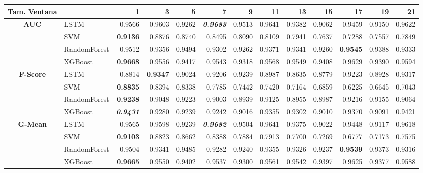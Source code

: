 \begin{table}[H]
	\centering
	\begin{adjustbox}{max width=14cm}
		\begin{tabular}{|c|l|r|r|r|r|r|r|r|r|r|r|r|}
			\hline
			\textbf{Tam. Ventana}&         &      1  &      3  &      5  &      7  &      9  &      11 &      13 &      15 &      17 &      19 &      21 \\
			\hline
			\textbf{AUC} &  LSTM &  0.9566 &  0.9603 &  0.9262 & \textit{ \textbf{  0.9683 } } &  0.9513 &  0.9641 &  0.9382 &  0.9062 &  0.9459 &  0.9150 &  0.9622 \\
			&  SVM & \textbf{  0.9136 } &  0.8876 &  0.8740 &  0.8495 &  0.8090 &  0.8109 &  0.7941 &  0.7637 &  0.7288 &  0.7557 &  0.7849 \\
			&  RandomForest &  0.9512 &  0.9356 &  0.9494 &  0.9302 &  0.9262 &  0.9371 &  0.9341 &  0.9260 & \textbf{  0.9545 } &  0.9388 &  0.9333 \\
			&  XGBoost & \textbf{  0.9668 } &  0.9556 &  0.9417 &  0.9543 &  0.9318 &  0.9568 &  0.9549 &  0.9408 &  0.9629 &  0.9390 &  0.9594 \\			
			\hline
			\textbf{F-Score} &  LSTM &  0.8814 & \textbf{  0.9347 } &  0.9024 &  0.9206 &  0.9239 &  0.8987 &  0.8635 &  0.8779 &  0.9223 &  0.8928 &  0.9317 \\
			&  SVM & \textbf{  0.8835 } &  0.8394 &  0.8338 &  0.7785 &  0.7442 &  0.7420 &  0.7164 &  0.6859 &  0.6225 &  0.6645 &  0.7043 \\
			&  RandomForest & \textbf{  0.9238 } &  0.9048 &  0.9223 &  0.9003 &  0.8939 &  0.9125 &  0.8955 &  0.8987 &  0.9216 &  0.9155 &  0.9064 \\
			&  XGBoost & \textit{ \textbf{  0.9431 } } &  0.9280 &  0.9239 &  0.9242 &  0.9016 &  0.9355 &  0.9302 &  0.9010 &  0.9370 &  0.9091 &  0.9421 \\
			\hline
			\textbf{G-Mean} &  LSTM &  0.9565 &  0.9598 &  0.9239 & \textit{ \textbf{  0.9682 } } &  0.9504 &  0.9641 &  0.9375 &  0.9022 &  0.9448 &  0.9117 &  0.9618 \\
			&  SVM & \textbf{  0.9103 } &  0.8823 &  0.8662 &  0.8388 &  0.7884 &  0.7913 &  0.7700 &  0.7269 &  0.6777 &  0.7173 &  0.7575 \\
			&  RandomForest &  0.9504 &  0.9341 &  0.9485 &  0.9282 &  0.9240 &  0.9355 &  0.9326 &  0.9237 & \textbf{  0.9539 } &  0.9373 &  0.9316 \\
			&  XGBoost & \textbf{  0.9665 } &  0.9550 &  0.9402 &  0.9537 &  0.9300 &  0.9561 &  0.9542 &  0.9397 &  0.9625 &  0.9377 &  0.9588 \\

\end{tabular}
\end{adjustbox}
\end{table}
